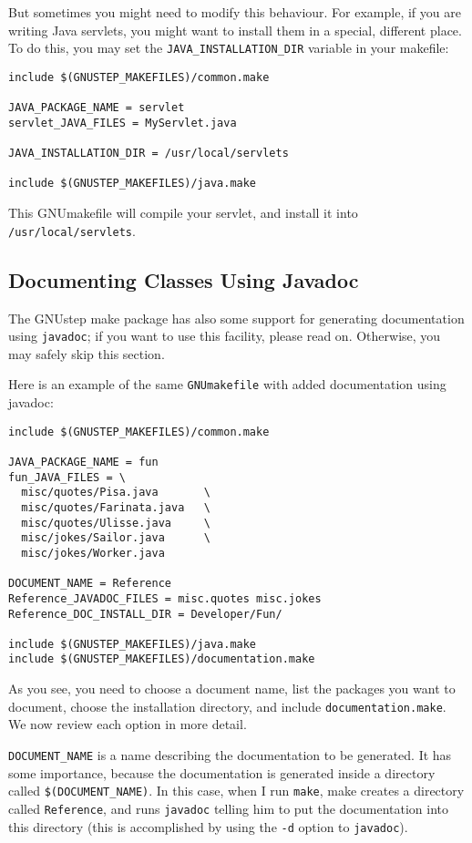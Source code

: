 But sometimes you might need to modify this behaviour.  For example,
if you are writing Java servlets, you might want to install them in a
special, different place.  To do this, you may set the
\texttt{JAVA\_INSTALLATION\_DIR} variable in your makefile:

\begin{verbatim}
include $(GNUSTEP_MAKEFILES)/common.make

JAVA_PACKAGE_NAME = servlet
servlet_JAVA_FILES = MyServlet.java

JAVA_INSTALLATION_DIR = /usr/local/servlets

include $(GNUSTEP_MAKEFILES)/java.make
\end{verbatim}

This GNUmakefile will compile your servlet, and install it into 
\texttt{/usr/local/servlets}.

\subsection{Documenting Classes Using Javadoc}

The GNUstep make package has also some support for generating
documentation using \texttt{javadoc}; if you want to use this
facility, please read on.  Otherwise, you may safely skip this
section.

Here is an example of the same \texttt{GNUmakefile} with added
documentation using javadoc:
\begin{verbatim}
include $(GNUSTEP_MAKEFILES)/common.make

JAVA_PACKAGE_NAME = fun
fun_JAVA_FILES = \
  misc/quotes/Pisa.java       \
  misc/quotes/Farinata.java   \
  misc/quotes/Ulisse.java     \
  misc/jokes/Sailor.java      \
  misc/jokes/Worker.java

DOCUMENT_NAME = Reference
Reference_JAVADOC_FILES = misc.quotes misc.jokes
Reference_DOC_INSTALL_DIR = Developer/Fun/

include $(GNUSTEP_MAKEFILES)/java.make
include $(GNUSTEP_MAKEFILES)/documentation.make
\end{verbatim}%
As you see, you need to choose a document name, list the packages you
want to document, choose the installation directory, and include
\texttt{documentation.make}.  We now review each option in more detail.

\texttt{DOCUMENT\_NAME} is a name describing the documentation to be 
generated.  It has some importance, because the documentation is
generated inside a directory called \texttt{\$(DOCUMENT\_NAME)}.  In
this case, when I run \texttt{make}, make creates a directory called
\texttt{Reference}, and runs \texttt{javadoc} telling him to put 
the documentation into this directory (this is accomplished by using
the \texttt{-d} option to \texttt{javadoc}).

